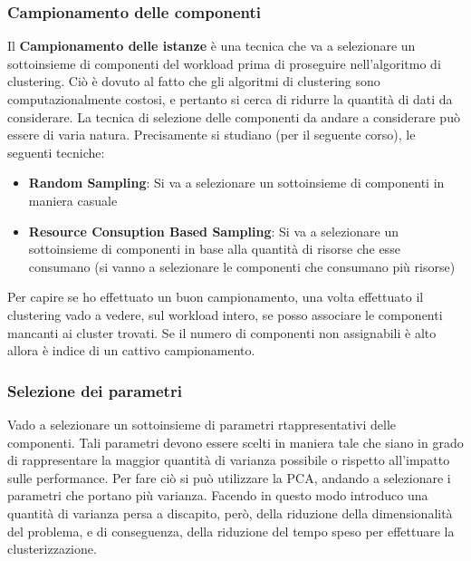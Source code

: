 \subsubsection{Campionamento delle componenti}
Il \textbf{Campionamento delle istanze} è una tecnica che va a selezionare un sottoinsieme di componenti del workload prima di proseguire nell'algoritmo di clustering. Ciò è dovuto al fatto che gli algoritmi di clustering sono computazionalmente costosi, e pertanto si cerca di ridurre la quantità di dati da considerare. La tecnica di selezione delle componenti da andare a considerare può essere di varia natura. Precisamente si studiano (per il seguente corso), le seguenti tecniche:
\begin{itemize}
    \item \textbf{Random Sampling}: Si va a selezionare un sottoinsieme di componenti in maniera casuale
    \item \textbf{Resource Consuption Based Sampling}: Si va a selezionare un sottoinsieme di componenti in base alla quantità di risorse che esse consumano (si vanno a selezionare le componenti che consumano più risorse)
\end{itemize}

Per capire se ho effettuato un buon campionamento, una volta effettuato il clustering vado a vedere, sul workload intero, se posso associare le componenti mancanti ai cluster trovati. Se il numero di componenti non assignabili è alto allora è indice di un cattivo campionamento.

\subsubsection{Selezione dei parametri}
Vado a selezionare un sottoinsieme di parametri rtappresentativi delle componenti. Tali parametri devono essere scelti in maniera tale che siano in grado di rappresentare la maggior quantità di varianza possibile o rispetto all'impatto sulle performance. Per fare ciò si può utilizzare la PCA, andando a selezionare i parametri che portano più varianza. Facendo in questo modo introduco una quantità di varianza persa a discapito, però, della riduzione della dimensionalità del problema, e di conseguenza, della riduzione del tempo speso per effettuare la clusterizzazione.

